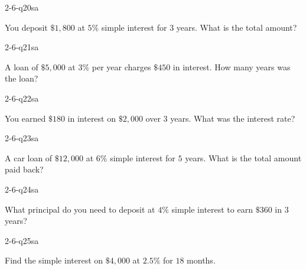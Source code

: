 \begin{practiceQuestion}{2-6-q20}{sa}
\begin{questionText}
You deposit $\$1{,}800$ at $5\%$ simple interest for $3$ years. What is the total amount?
\end{questionText}
\end{practiceQuestion}

\begin{practiceQuestion}{2-6-q21}{sa}
\begin{questionText}
A loan of $\$5{,}000$ at $3\%$ per year charges $\$450$ in interest. How many years was the loan?
\end{questionText}
\end{practiceQuestion}

\begin{practiceQuestion}{2-6-q22}{sa}
\begin{questionText}
You earned $\$180$ in interest on $\$2{,}000$ over $3$ years. What was the interest rate?
\end{questionText}
\end{practiceQuestion}

\begin{practiceQuestion}{2-6-q23}{sa}
\begin{questionText}
A car loan of $\$12{,}000$ at $6\%$ simple interest for $5$ years. What is the total amount paid back?
\end{questionText}
\end{practiceQuestion}

\begin{practiceQuestion}{2-6-q24}{sa}
\begin{questionText}
What principal do you need to deposit at $4\%$ simple interest to earn $\$360$ in $3$ years?
\end{questionText}
\end{practiceQuestion}

\begin{practiceQuestion}{2-6-q25}{sa}
\begin{questionText}
Find the simple interest on $\$4{,}000$ at $2.5\%$ for $18$ months.
\end{questionText}
\end{practiceQuestion}

